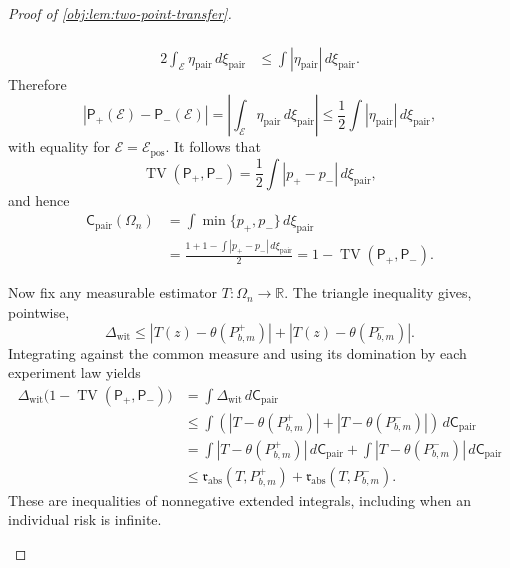 \documentclass[11pt]{article}
\begin{document}
\begin{proof}[Proof of \cref{obj:lem:two-point-transfer}]
\begin{enumerate}
\[\begin{aligned}
\\
2\int_{\mathcal E}\eta_{\mathrm{pair}}\,d\xi_{\mathrm{pair}}
&\le\int|\eta_{\mathrm{pair}}|\,d\xi_{\mathrm{pair}}.
\end{aligned}
\]
Therefore
\[
\left|\mathsf P_+(\mathcal E)-\mathsf P_-(\mathcal E)\right|
=
\left|\int_{\mathcal E}\eta_{\mathrm{pair}}\,d\xi_{\mathrm{pair}}\right|
\le
\frac12\int|\eta_{\mathrm{pair}}|\,d\xi_{\mathrm{pair}},
\]
with equality for \(\mathcal E=\mathcal E_{\mathrm{pos}}\). It follows that
\[
\operatorname{TV}(\mathsf P_+,\mathsf P_-)
=
\frac12\int|p_+-p_-|\,d\xi_{\mathrm{pair}},
\]
and hence
\[
\begin{aligned}
\mathsf C_{\mathrm{pair}}(\Omega_n)
&=
\int\min\{p_+,p_-\}\,d\xi_{\mathrm{pair}}
\\
&=
\frac{1+1-\int|p_+-p_-|\,d\xi_{\mathrm{pair}}}{2}
=
1-\operatorname{TV}(\mathsf P_+,\mathsf P_-).
\end{aligned}
\]

Now fix any measurable estimator \(T:\Omega_n\to\mathbb R\). The triangle inequality gives, pointwise,
\[
\Delta_{\mathrm{wit}}
\le
|T(z)-\theta(P^+_{b,m})|
+
|T(z)-\theta(P^-_{b,m})|.
\]
Integrating against the common measure and using its domination by each experiment law yields
\[
\begin{aligned}
\Delta_{\mathrm{wit}}
\bigl(1-\operatorname{TV}(\mathsf P_+,\mathsf P_-)\bigr)
&=
\int\Delta_{\mathrm{wit}}\,d\mathsf C_{\mathrm{pair}}
\\
&\le
\int
\left(
|T-\theta(P^+_{b,m})|
+
|T-\theta(P^-_{b,m})|
\right)\,d\mathsf C_{\mathrm{pair}}
\\
&=
\int|T-\theta(P^+_{b,m})|\,d\mathsf C_{\mathrm{pair}}
+
\int|T-\theta(P^-_{b,m})|\,d\mathsf C_{\mathrm{pair}}
\\
&\le
\mathfrak r_{\mathrm{abs}}(T,P^+_{b,m})
+
\mathfrak r_{\mathrm{abs}}(T,P^-_{b,m}).
\end{aligned}
\]
These are inequalities of nonnegative extended integrals, including when an individual risk is infinite.


\end{enumerate}
\end{proof}
\end{document}
